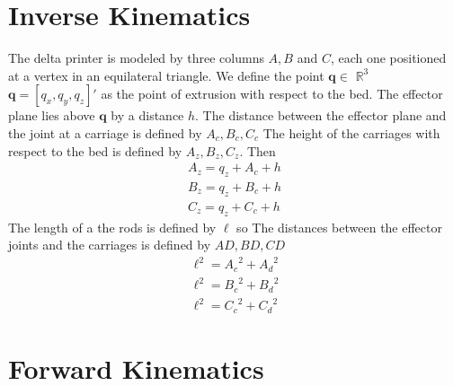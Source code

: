 \documentclass[sigconf]{acmart}
\begin{document}


\section{Inverse Kinematics}
The delta printer is modeled by three columns $A, B$ and $C$, each one positioned at a vertex in an equilateral triangle. We define the point $\bm{q} \in $  ${\mathbb{R}^3}$ $\bm{q}=[q_x, q_y, q_z]'$ as the point of extrusion with respect to the bed. 
The effector plane lies above $\bm{q}$ by a distance $h$. 
The distance between the effector plane and the joint at a carriage is defined by $A_c, B_c, C_c$
The height of the carriages with respect to the bed is defined by $A_z, B_z, C_z$.
Then
\begin{equation}
\begin{matrix}
A_z = q_z + A_c + h \\
B_z = q_z + B_c + h \\
C_z = q_z + C_c + h
\end{matrix}
\end{equation}
The length of a the rods is defined by $\ell$ so
The distances between the effector joints and the carriages is defined by $AD, BD, CD$ 
\begin{equation}
\begin{matrix}
\ell^2 = {A_c}^2 + {A_d}^2 \\
\ell^2 = {B_c}^2 + {B_d}^2 \\
\ell^2 = {C_c}^2 + {C_d}^2
\end{matrix}
\end{equation}



\section{Forward Kinematics}
\end{document}
